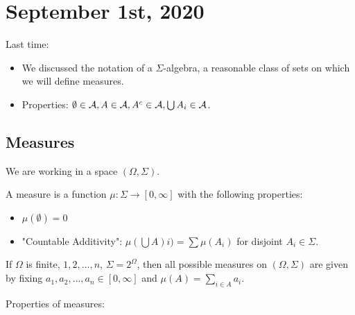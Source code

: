 \documentclass[11pt]{scrartcl}
\begin{document}
\newpage
\section{September 1st, 2020}
Last time:
\begin{itemize}
 \item We discussed the notation of a $\Sigma$-algebra, a reasonable class of sets on which we will define measures.
 \item Properties: $\emptyset \in \mathcal A, A \in \mathcal A, A^c \in \mathcal A, \bigcup A_i \in \mathcal A$.
 \end{itemize} 
\subsection{Measures}
We are working in a space $(\Omega, \Sigma)$.  
\begin{definition}[Measure] A measure is a function $\mu: \Sigma \rightarrow [0, \infty]$ with the following properties:
\begin{itemize}
\item $\mu(\emptyset) = 0$
\item "Countable Additivity": $\mu(\bigcup A)i) = \sum \mu(A_i)$ for disjoint $A_i \in \Sigma$.
\end{itemize}
\end{definition}
\begin{example} If $\Omega$ is finite, ${1, 2, \dots, n}$, $\Sigma = 2^{\Omega}$, then all possible measures on $(\Omega, \Sigma)$ are given by fixing $a_1, a_2, \dots, a_n \in [0, \infty]$ and $\mu(A) = \sum_{i \in A} a_i$.
\end{example}
Properties of measures:
\end{document}
